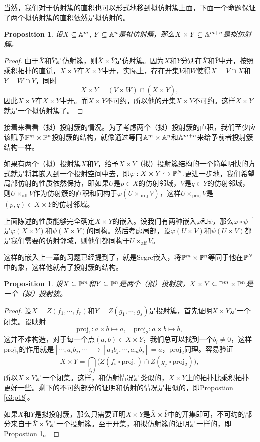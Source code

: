 \documentclass[9pt]{extbook}
\theoremstyle{plain}%
\newtheorem{pro}[defi]{Proposition}%
\begin{document}
当然，我们对于仿射簇的直积也可以形式地移到拟仿射簇上面，下面一个命题保证了两个拟仿射簇的直积依然是拟仿射的。
\begin{pro}
	设$X\subseteq \mathbb{A}^{m}$, $Y\subseteq \mathbb{A}^{n}$是拟仿射簇，那么$X\times Y\subseteq \mathbb{A}^{m+n}$是拟仿射簇。
	\label{c3:p23}
\end{pro}
\begin{proof}
	由于$\bar{X}$和$\bar{Y}$是仿射簇，则$\bar{X}\times \bar{Y}$是仿射簇。因为$X$和$Y$分别在$\bar{X}$和$\bar{Y}$中开，按照乘积拓扑的直觉，$X\times Y$在$\bar{X}\times \bar{Y}$中开，实际上，存在开集$V$和$W$使得$X=V\cap \bar{X}$和$Y=W\cap \bar{Y}$，同时
	\[
		X\times Y=(V\times W)\cap(\bar{X}\times \bar{Y}),
	\]
	因此$X\times Y$在$\bar{X}\times \bar{Y}$中开。而$\bar{X}\times \bar{Y}$不可约，所以他的开集$X\times Y$不可约。这样$X\times Y$就是一个拟仿射簇了。
\end{proof}

接着来看看（拟）投射簇的情况。为了考虑两个（拟）投射簇的直积，我们至少应该赋予$\mathbb{P}^m\times \mathbb{P}^n$投射簇的结构，就像通过等同$\mathbb{A}^{m}\times \mathbb{A}^n$和$\mathbb{A}^{m+n}$来给予前者投射簇结构一样。

如果有两个（拟）投射簇$X$和$Y$，给予$X\times Y$（拟）投射簇结构的一个简单明快的方式就是将其嵌入到一个投射空间中去，即$\varphi:X\times Y\hookrightarrow \mathbb{P}^N$.更进一步地，我们希望局部仿射的性质依然保持，即如果$U$是$p\in X$的仿射邻域，$V$是$q\in Y$的仿射邻域，则$U\times_{\mathrm{aff}} V$作为仿射簇的直积和同构于$\varphi(U\times_{\mathrm{proj}} V)$，这样$U\times_{\mathrm{proj}} V$是$(p,q)\in X\times Y$的仿射邻域。

上面陈述的性质能够完全确定$X\times Y$的嵌入。设我们有两种嵌入$\varphi$和$\psi$，那么$\varphi\circ \psi^{-1}$是$\varphi(X\times Y)$和$\psi(X\times Y)$的同构。然后考虑局部，设$\varphi(U\times V)$和$\psi(U\times V)$都是我们需要的仿射邻域，则他们都同构于$U\times_{\mathrm{aff}} V$。

这样的嵌入上一章的习题已经提到了，就是Segre嵌入，将$\mathbb{P}^m\times \mathbb{P}^n$等同于他在$\mathbb{P}^N$中的象，这样他就有了投射簇的结构。
\begin{pro}
	设$X\subseteq \mathbb{P}^m$和$Y\subseteq \mathbb{P}^n$是两个（拟）投射簇，$X\times Y\subseteq \mathbb{P}^m\times \mathbb{P}^n$是一个（拟）投射簇。
\end{pro}
\begin{proof}
	设$X=Z(f_1,\cdots,f_r)$和$Y=Z(g_1,\cdots,g_s)$是投射簇，首先证明$X\times Y$是一个闭集。设映射
	\[
		\mathrm{proj}_1:a\times b\mapsto a,\quad \mathrm{proj}_2:a\times b\mapsto b,
	\]
	这并不难构造，对于每一个点$(a,b)\in X\times Y$，我们总可以找到一个$b_i\neq 0$，这样$\mathrm{proj}_1$的作用就是$[\cdots,a_ib_j,\cdots]\mapsto [a_0b_j,\cdots,a_mb_j]=a$，$\mathrm{proj}_2$同理。容易验证
	\[
		X\times Y=\bigcap_{i,j}\bigl(Z(f_i\circ \mathrm{proj}_1)\cap Z(g_j\circ \mathrm{proj}_2)\bigr),
	\]
	所以$X\times Y$是一个闭集。这样，和仿射情况是类似的，$X\times Y$上的拓扑比乘积拓扑更好一些。剩下的不可约部分的证明和仿射的情况是相似的，即Propostion \ref{c3:p18}。

	如果$X$和$Y$是拟投射簇，那么只需要证明$X\times Y$是$\bar{X}\times \bar{Y}$中的开集即可，不可约的部分来自于$\bar{X}\times \bar{Y}$是一个投射簇。至于开集，和拟仿射簇的证明是一样的，即Propostion \ref{c3:p23}。
\end{proof}
\end{document}
